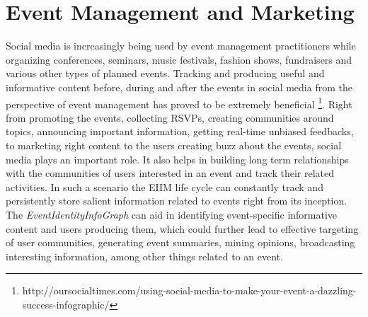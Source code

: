 \section{Event Management and Marketing}
Social media is increasingly being used  by event management practitioners while organizing conferences, seminars, music festivals, fashion shows, fundraisers and various other types of planned events. Tracking and producing useful and informative content before, during and after the events in social media from the perspective of event management has proved to be extremely beneficial \footnote{http://oursocialtimes.com/using-social-media-to-make-your-event-a-dazzling-success-infographic/}. Right from promoting the events, collecting RSVPs, creating communities around topics, announcing important information, getting real-time unbiased feedbacks, to marketing right content to the users creating buzz about the events, social media plays an important role. It also helps in building long term relationships with the communities of users interested in an event and track their related activities. In such a scenario the EIIM life cycle can constantly track and persistently store salient information related to events right from its inception. The \textit{EventIdentityInfoGraph} can aid in identifying event-specific informative content and users producing them, which could further lead to effective targeting of user communities, generating event summaries, mining opinions, broadcasting interesting information, among other things related to an event.

